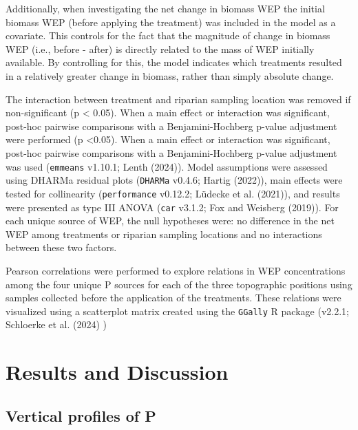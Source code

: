 \documentclass[
]{agujournal2019}
\begin{document}
Additionally, when investigating the net change in biomass WEP the
initial biomass WEP (before applying the treatment) was included in the
model as a covariate. This controls for the fact that the magnitude of
change in biomass WEP (i.e., before - after) is directly related to the
mass of WEP initially available. By controlling for this, the model
indicates which treatments resulted in a relatively greater change in
biomass, rather than simply absolute change.

The interaction between treatment and riparian sampling location was
removed if non-significant (p \textless{} 0.05). When a main effect or
interaction was significant, post-hoc pairwise comparisons with a
Benjamini-Hochberg p-value adjustment were performed (p \textless0.05).
When a main effect or interaction was significant, post-hoc pairwise
comparisons with a Benjamini-Hochberg p-value adjustment was used
(\texttt{emmeans} v1.10.1; Lenth (2024)). Model assumptions were
assessed using DHARMa residual plots (\texttt{DHARMa} v0.4.6; Hartig
(2022)), main effects were tested for collinearity (\texttt{performance}
v0.12.2; Lüdecke et al. (2021)), and results were presented as type III
ANOVA (\texttt{car} v3.1.2; Fox and Weisberg (2019)). For each unique
source of WEP, the null hypotheses were: no difference in the net WEP
among treatments or riparian sampling locations and no interactions
between these two factors.

Pearson correlations were performed to explore relations in WEP
concentrations among the four unique P sources for each of the three
topographic positions using samples collected before the application of
the treatments. These relations were visualized using a scatterplot
matrix created using the \texttt{GGally} R package (v2.2.1; Schloerke et
al. (2024) )

\section{Results and Discussion}\label{results-and-discussion}

\subsection{Vertical profiles of P}\label{vertical-profiles-of-p}
\end{document}
